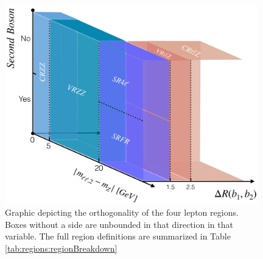 \begin{figure}[tbp]
  \begin{center}
    \includegraphics[width=0.98\textwidth]{figs/rpvthreel/4lregions.png}
  \end{center}
  \caption[Graphic depicting the orthogonality of the four lepton regions.]
          {Graphic depicting the orthogonality of the four lepton regions.
          Boxes without a side are unbounded in that direction in that variable.
          The full region definitions are summarized in Table \ref{tab:regions:regionBreakdown}}
          \label{fig:4lorthogonality}
\end{figure}
